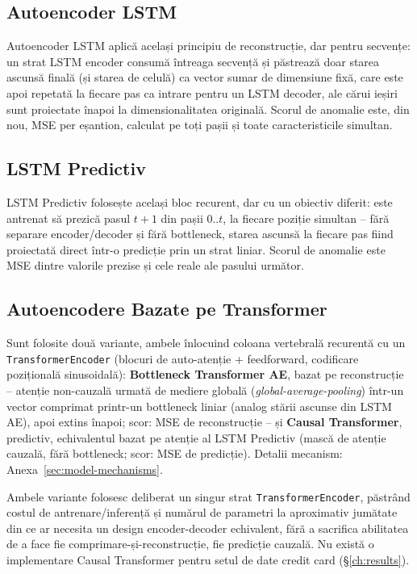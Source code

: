 \subsection{Autoencoder LSTM}

Autoencoder LSTM aplică același principiu de reconstrucție, dar pentru secvențe: un strat LSTM encoder consumă întreaga secvență și păstrează doar starea ascunsă finală (și starea de celulă) ca vector sumar de dimensiune fixă, care este apoi repetată la fiecare pas ca intrare pentru un LSTM decoder, ale cărui ieșiri sunt proiectate înapoi la dimensionalitatea originală. Scorul de anomalie este, din nou, MSE per eșantion, calculat pe toți pașii și toate caracteristicile simultan.

\subsection{LSTM Predictiv}

LSTM Predictiv folosește același bloc recurent, dar cu un obiectiv diferit: este antrenat să prezică pasul $t+1$ din pașii $0..t$, la fiecare poziție simultan -- fără separare encoder/decoder și fără bottleneck, starea ascunsă la fiecare pas fiind proiectată direct într-o predicție prin un strat liniar. Scorul de anomalie este MSE dintre valorile prezise și cele reale ale pasului următor.

\subsection{Autoencodere Bazate pe Transformer}

Sunt folosite două variante, ambele înlocuind coloana vertebrală recurentă cu un \texttt{Trans\-form\-er\-En\-cod\-er} (blocuri de auto-atenție + feedforward, codificare pozițională sinusoidală): \textbf{Bottleneck Transformer AE}, bazat pe reconstrucție -- atenție non-cauzală urmată de mediere globală (\emph{global-average-pooling}) într-un vector comprimat printr-un bottleneck liniar (analog stării ascunse din LSTM AE), apoi extins înapoi; scor: MSE de reconstrucție -- și \textbf{Causal Transformer}, predictiv, echivalentul bazat pe atenție al LSTM Predictiv (mască de atenție cauzală, fără bottleneck; scor: MSE de predicție). Detalii mecanism: Anexa~\ref{sec:model-mechanisms}.

Ambele variante folosesc deliberat un singur strat \texttt{TransformerEncoder}, păstrând costul de antrenare/inferență și numărul de parametri la aproximativ jumătate din ce ar necesita un design encoder-decoder echivalent, fără a sacrifica abilitatea de a face fie comprimare-și-reconstrucție, fie predicție cauzală. Nu există o implementare Causal Transformer pentru setul de date credit card (\S\ref{ch:results}).

